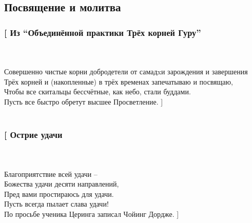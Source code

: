 \subsection*{Посвящение и молитва}
\vspace{1cm}
\subsubsection*{[ Из “Объединённой практики Трёх корней Гуру”}\\
\\
Совершенно чистые корни добродетели от самадxи зарождения и завершения\\
Трёх корней и (накопленные) в трёх временах запечатываю и посвящаю,\\
Чтобы все скитальцы бессчётные, как небо, стали буддами.\\
Пусть все быстро обретут высшее Просветление. ]\\
\\
\subsubsection*{[ Острие удачи}\\
\\
Благоприятствие всей удачи – \\
Божества удачи десяти направлений,\\
Пред вами простираюсь для удачи.\\
Пусть всегда пылает слава удачи!\\
\scriptsize
По просьбе ученика Церинга записал Чойинг Дордже.
\normalsize
 ]\\
\\
